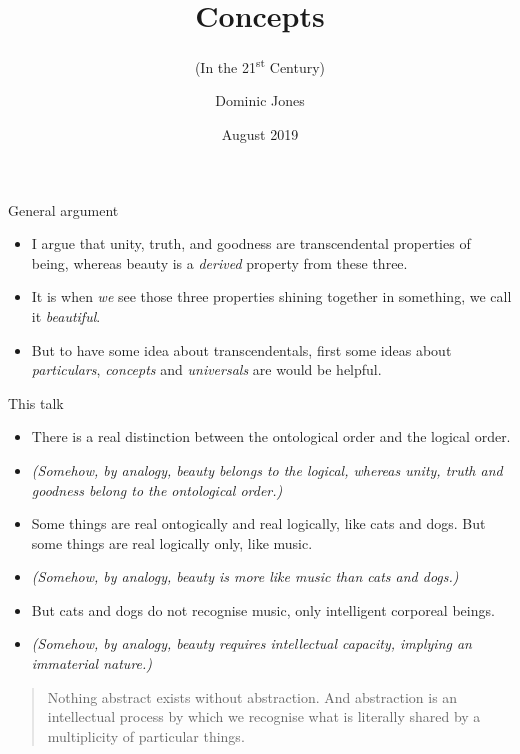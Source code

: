 \documentclass[xcolor=dvipsnames]{beamer}
\title{Concepts}
\subtitle{(In the 21\textsuperscript{st} Century)}
\author{Dominic Jones}
\date{\small{August 2019}}
\institute{\small{University of Buckingham}}
\begin{document}
\begin{frame}[plain]
  \titlepage
\end{frame}


\begin{frame}[fragile]{General argument}
  \begin{itemize}
  \item I argue that unity, truth, and goodness are transcendental properties of being, whereas beauty is a \emph{derived} property from these three.\vspace{5mm}
  \item It is when \emph{we} see those three properties shining together in something, we call it \emph{beautiful}.\vspace{5mm}
  \item But to have some idea about transcendentals, first some ideas about \emph{particulars}, \emph{concepts} and \emph{universals} are would be helpful.
  \end{itemize}
\end{frame}


\begin{frame}[fragile]{This talk}
  \begin{itemize}
  \item There is a real distinction between the ontological order and the logical order.\vspace{5mm}
  \item \emph{(Somehow, by analogy, beauty belongs to the logical, whereas unity, truth and goodness belong to the ontological order.)}\vspace{5mm}
  \item Some things are real ontogically and real logically, like cats and dogs. But some things are real logically only, like music. \vspace{5mm}
  \item \emph{(Somehow, by analogy, beauty is more like music than cats and dogs.)}\vspace{5mm}
  \item But cats and dogs do not recognise music, only intelligent corporeal beings.\vspace{5mm}
  \item \emph{(Somehow, by analogy, beauty requires intellectual capacity, implying an immaterial nature.)}\vspace{5mm}
  \end{itemize}
\end{frame}


\begin{frame}{}
  \begin{quote}
    Nothing abstract exists without abstraction. And abstraction is an intellectual process by which we recognise what is literally shared by a multiplicity of particular things.
  \end{quote}
      \hspace*{8cm}{David Oderberg}
\end{frame}
\end{document}
